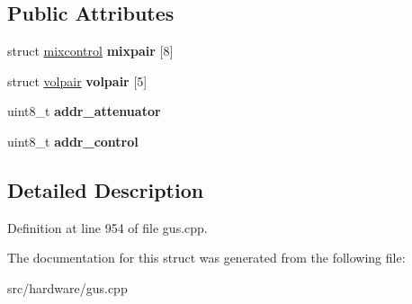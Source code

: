 \subsection*{Public Attributes}
\begin{DoxyCompactItemize}
\item 
\hypertarget{structgus__ICS2101_a7e5b7610442c6f3de38ae67487d9ccfa}{struct \hyperlink{structgus__ICS2101_1_1mixcontrol}{mixcontrol} {\bfseries mixpair} \mbox{[}8\mbox{]}}\label{structgus__ICS2101_a7e5b7610442c6f3de38ae67487d9ccfa}

\item 
\hypertarget{structgus__ICS2101_af99b01cfc9793b759b5c309fd605b563}{struct \hyperlink{structgus__ICS2101_1_1volpair}{volpair} {\bfseries volpair} \mbox{[}5\mbox{]}}\label{structgus__ICS2101_af99b01cfc9793b759b5c309fd605b563}

\item 
\hypertarget{structgus__ICS2101_a259bb6122df1b8689fdf2c5445f23623}{uint8\-\_\-t {\bfseries addr\-\_\-attenuator}}\label{structgus__ICS2101_a259bb6122df1b8689fdf2c5445f23623}

\item 
\hypertarget{structgus__ICS2101_ab1b4294e06737b43bd2fba7eeaee46ee}{uint8\-\_\-t {\bfseries addr\-\_\-control}}\label{structgus__ICS2101_ab1b4294e06737b43bd2fba7eeaee46ee}

\end{DoxyCompactItemize}


\subsection{Detailed Description}


Definition at line 954 of file gus.\-cpp.



The documentation for this struct was generated from the following file\-:\begin{DoxyCompactItemize}
\item 
src/hardware/gus.\-cpp\end{DoxyCompactItemize}
